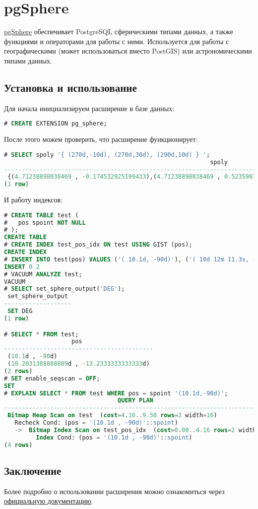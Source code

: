\section{pgSphere}

\href{http://pgsphere.github.io/}{pgSphere} обеспечивает PostgreSQL сферическими типами данных, а также функциями и операторами для работы с ними. Используется для работы с географическими (может использоваться вместо PostGIS) или астрономическими типами данных.

\subsection{Установка и использование}

Для начала инициализируем расширение в базе данных:

\begin{lstlisting}[language=SQL,label=lst:pgsphereinit,caption=Инициализация pgSphere]
# CREATE EXTENSION pg_sphere;
\end{lstlisting}

После этого можем проверить, что расширение функционирует:

\begin{lstlisting}[language=SQL,label=lst:pgsphereex1,caption=Проверка pgSphere]
# SELECT spoly '{ (270d,-10d), (270d,30d), (290d,10d) } ';
                                                          spoly
-------------------------------------------------------------------------------------------------------------------------
 {(4.71238898038469 , -0.174532925199433),(4.71238898038469 , 0.523598775598299),(5.06145483078356 , 0.174532925199433)}
(1 row)
\end{lstlisting}

И работу индексов:

\begin{lstlisting}[language=SQL,label=lst:pgsphereex2,caption=Проверка pgSphere]
# CREATE TABLE test (
#   pos spoint NOT NULL
# );
CREATE TABLE
# CREATE INDEX test_pos_idx ON test USING GIST (pos);
CREATE INDEX
# INSERT INTO test(pos) VALUES ('( 10.1d, -90d)'), ('( 10d 12m 11.3s, -13d 14m)');
INSERT 0 2
# VACUUM ANALYZE test;
VACUUM
# SELECT set_sphere_output('DEG');
 set_sphere_output
-------------------
 SET DEG
(1 row)

# SELECT * FROM test;
                   pos
------------------------------------------
 (10.1d , -90d)
 (10.2031388888889d , -13.2333333333333d)
(2 rows)
# SET enable_seqscan = OFF;
SET
# EXPLAIN SELECT * FROM test WHERE pos = spoint '(10.1d,-90d)';
                                QUERY PLAN
---------------------------------------------------------------------------
 Bitmap Heap Scan on test  (cost=4.16..9.50 rows=2 width=16)
   Recheck Cond: (pos = '(10.1d , -90d)'::spoint)
   ->  Bitmap Index Scan on test_pos_idx  (cost=0.00..4.16 rows=2 width=0)
         Index Cond: (pos = '(10.1d , -90d)'::spoint)
(4 rows)
\end{lstlisting}

\subsection{Заключение}

Более подробно о использовании расширения можно ознакомиться через \href{http://pgsphere.projects.pgfoundry.org/}{официальную документацию}.
